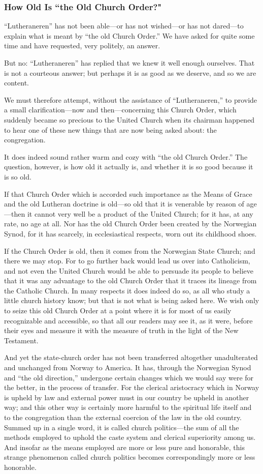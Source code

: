 \subsubsection{How Old Is “the Old Church Order?"}

“Lutheraneren” has not been able—or has not wished—or has not dared—to explain what is meant by “the old Church Order.” We have asked for quite some time and have requested, very politely, an answer.

But no: “Lutheraneren” has replied that we knew it well enough ourselves. That is not a courteous answer; but perhaps it is as good as we deserve, and so we are content.

We must therefore attempt, without the assistance of “Lutheraneren,” to provide a small clarification—now and then—concerning this Church Order, which suddenly became so precious to the United Church when its chairman happened to hear one of these new things that are now being asked about: the congregation.

It does indeed sound rather warm and cozy with “the old Church Order.” The question, however, is how old it actually is, and whether it is so good because it is so old.

If that Church Order which is accorded such importance as the Means of Grace and the old Lutheran doctrine is old—so old that it is venerable by reason of age—then it cannot very well be a product of the United Church; for it has, at any rate, no age at all. Nor has the old Church Order been created by the Norwegian Synod, for it has scarcely, in ecclesiastical respects, worn out its childhood shoes.

If the Church Order is old, then it comes from the Norwegian State Church; and there we may stop. For to go further back would lead us over into Catholicism, and not even the United Church would be able to persuade its people to believe that it was any advantage to the old Church Order that it traces its lineage from the Catholic Church. In many respects it does indeed do so, as all who study a little church history know; but that is not what is being asked here. We wish only to seize this old Church Order at a point where it is for most of us easily recognizable and accessible, so that all our readers may see it, as it were, before their eyes and measure it with the measure of truth in the light of the New Testament.

And yet the state-church order has not been transferred altogether unadulterated and unchanged from Norway to America. It has, through the Norwegian Synod and “the old direction,” undergone certain changes which we would say were for the better, in the process of transfer. For the clerical aristocracy which in Norway is upheld by law and external power must in our country be upheld in another way; and this other way is certainly more harmful to the spiritual life itself and to the congregation than the external coercion of the law in the old country. Summed up in a single word, it is called church politics—the sum of all the methods employed to uphold the caste system and clerical superiority among us. And insofar as the means employed are more or less pure and honorable, this strange phenomenon called church politics becomes correspondingly more or less honorable.

